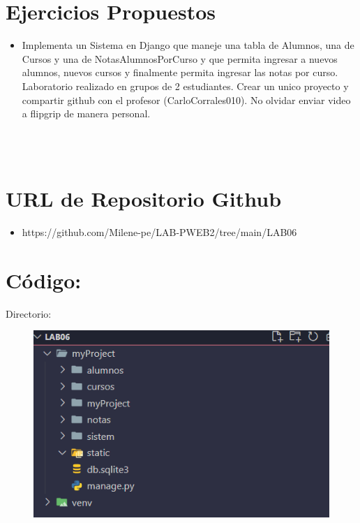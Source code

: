 \documentclass{article}
\begin{document}
	\section{Ejercicios Propuestos}
	\begin{itemize}		
  \\
 \item Implementa un Sistema en Django que maneje una tabla de Alumnos, una de Cursos y una de NotasAlumnosPorCurso y que permita ingresar a nuevos alumnos, nuevos cursos y finalmente permita ingresar las notas por curso.
Laboratorio realizado en grupos de 2 estudiantes.  Crear un unico proyecto y compartir github con el profesor (CarloCorrales010).
No olvidar enviar video a flipgrip de manera personal.


	\end{itemize}


 \\
  \\
 \section{URL de Repositorio Github}
	\begin{itemize}
		\item https://github.com/Milene-pe/LAB-PWEB2/tree/main/LAB06

	\end{itemize}

 \section{Código:}
     \item Directorio:
	\begin{figure}[H]
           \centering
           \includegraphics[scale=0.5]{latex/img/img1.png}
     \end{figure}
\end{document}
